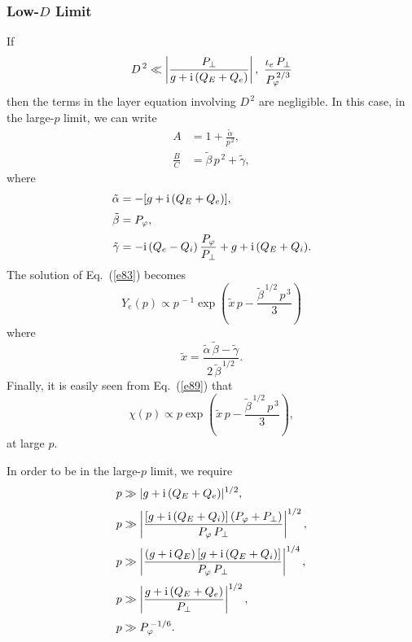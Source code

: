 \documentclass[titlepage=false,12pt]{article}
\begin{document}
\subsubsection{Low-$D$ Limit}\label{lowd}
If
\begin{align}
D^{\,2}\ll \left|\frac{P_\perp}{g + {\rm i}\,(Q_E+Q_e)}\right|, ~\frac{\iota_e\,P_\perp}{P_\varphi^{\,2/3}}
\end{align}
then the terms in the layer equation involving $D^{\,2}$ are negligible. In this case, in the large-$p$ limit,  we can write
\begin{align}
A&= 1+\frac{\tilde{\alpha}}{p^{\,2}},\\[0.5ex]
\frac{B}{C} &= \tilde{\beta}\,p^{\,2}+\tilde{\gamma},
\end{align}
where
\begin{align}
\tilde{\alpha} &= - [g+{\rm i}\,(Q_E+Q_e)],\\[0.5ex]
\tilde{\beta} &= P_\varphi,\\[0.5ex]
\tilde{\gamma}&= -{\rm i}\,(Q_e-Q_i)\,\frac{P_\varphi}{P_\perp} + g + {\rm i}\,(Q_E+Q_i).
\end{align}
The solution of Eq.~(\ref{e83}) becomes
\begin{equation}
Y_e(p)\propto p^{\,-1}\exp\left(\tilde{x}\,p - \frac{\tilde{\beta}^{\,1/2}\,p^{\,3}}{3}\right)
\end{equation}
where
\begin{equation}
\tilde{x} = \frac{\tilde{\alpha}\,\tilde{\beta}-\tilde{\gamma}}{2\,\tilde{\beta}^{\,1/2}}.
\end{equation}
Finally, it is easily seen from Eq.~(\ref{e89}) that
\begin{equation}
\chi(p) \propto  p\exp\left(\tilde{x}\,p - \frac{\tilde{\beta}^{\,1/2}\,p^{\,3}}{3}\right),
\end{equation}
at large $p$. 

In order to be in the large-$p$ limit, we require
\begin{align}
p&\gg |g+{\rm i}\,(Q_E+Q_e)|^{1/2},\\[0.5ex]
p&\gg\left|\frac{[g+{\rm i}\,(Q_E+Q_i)]\,(P_\varphi + P_\perp)}{P_\varphi\,P_\perp}\right|^{1/2},\\[0.5ex]
p&\gg \left|\frac{(g+{\rm i}\,Q_E)\,[g+{\rm i}\,(Q_E+Q_i)]}{P_\varphi\,P_\perp}\right|^{1/4},\\[0.5ex]
p&\gg \left|\frac{g+{\rm i}\,(Q_E+Q_e)}{P_\perp}\right|^{1/2},\\[0.5ex]
p&\gg P_\varphi^{\,-1/6}.
\end{align} 
\end{document}
